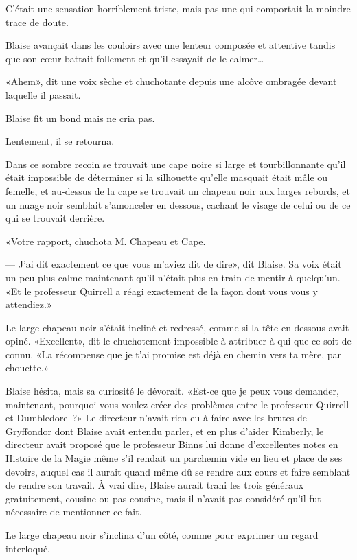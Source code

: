 C'était une sensation horriblement triste, mais pas une qui comportait la moindre trace de doute.


Blaise avançait dans les couloirs avec une lenteur composée et attentive tandis que son cœur battait follement et qu'il essayait de le calmer…

«Ahem», dit une voix sèche et chuchotante depuis une alcôve ombragée devant laquelle il passait.

Blaise fit un bond mais ne cria pas.

Lentement, il se retourna.

Dans ce sombre recoin se trouvait une cape noire si large et tourbillonnante qu'il était impossible de déterminer si la silhouette qu'elle masquait était mâle ou femelle, et au-dessus de la cape se trouvait un chapeau noir aux larges rebords, et un nuage noir semblait s'amonceler en dessous, cachant le visage de celui ou de ce qui se trouvait derrière.

«Votre rapport, chuchota M. Chapeau et Cape.

--- J'ai dit exactement ce que vous m'aviez dit de dire», dit Blaise. Sa voix était un peu plus calme maintenant qu'il n'était plus en train de mentir à quelqu'un. «Et le professeur Quirrell a réagi exactement de la façon dont vous vous y attendiez.»

Le large chapeau noir s'était incliné et redressé, comme si la tête en dessous avait opiné. «Excellent», dit le chuchotement impossible à attribuer à qui que ce soit de connu. «La récompense que je t'ai promise est déjà en chemin vers ta mère, par chouette.»

Blaise hésita, mais sa curiosité le dévorait. «Est-ce que je peux vous demander, maintenant, pourquoi vous voulez créer des problèmes entre le professeur Quirrell et Dumbledore~?» Le directeur n'avait rien eu à faire avec les brutes de Gryffondor dont Blaise avait entendu parler, et en plus d'aider Kimberly, le directeur avait proposé que le professeur Binns lui donne d'excellentes notes en Histoire de la Magie même s'il rendait un parchemin vide en lieu et place de ses devoirs, auquel cas il aurait quand même dû se rendre aux cours et faire semblant de rendre son travail. À vrai dire, Blaise aurait trahi les trois généraux gratuitement, cousine ou pas cousine, mais il n'avait pas considéré qu'il fut nécessaire de mentionner ce fait.

Le large chapeau noir s'inclina d'un côté, comme pour exprimer un regard interloqué.

